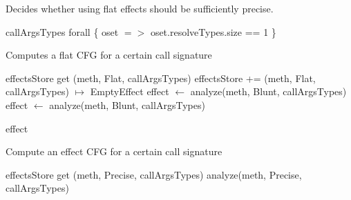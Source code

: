 \documentclass[a4paper]{article}
\begin{document}
\begin{algorithm}
\caption{Decides whether using flat effects should be sufficiently
precise.}\label{algo:pt:shouldwe}
\begin{algorithmic}[1]
    \State \Return callArgsTypes forall \{ oset $=>$ oset.resolveTypes.size == 1 \}
\EndFunction
\end{algorithmic}
\end{algorithm}

\begin{algorithm}
\caption{Computes a flat CFG for a certain call signature}\label{algo:pt:getflatcfg}
\begin{algorithmic}[1]
        \State \Return effectsStore get (meth, Flat, callArgsTypes)
    \Else
        \State effectsStore += (meth, Flat, callArgsTypes) $\mapsto$ EmptyEffect
        \State effect $\gets$ analyze(meth, Blunt, callArgsTypes)
        \Repeat
            \State effect $\gets$ analyze(meth, Blunt, callArgsTypes)

        \State \Return effect
    \EndIf
\EndFunction
\end{algorithmic}
\end{algorithm}

\begin{algorithm}
\caption{Compute an effect CFG for a certain call signature}\label{algo:pt:getanalyzedcfg}
\begin{algorithmic}[1]
        \State \Return effectsStore get (meth, Precise, callArgsTypes)
    \Else
        \State \Return analyze(meth, Precise, callArgsTypes)
    \EndIf
\EndFunction
\end{algorithmic}
\end{algorithm}
\end{document}
